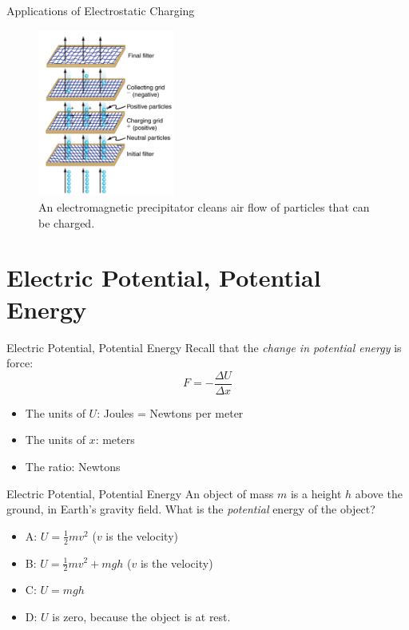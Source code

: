 \documentclass{beamer}
\begin{document}
\begin{frame}{Applications of Electrostatic Charging}
\begin{figure}
\centering
\includegraphics[width=0.4\textwidth]{figures/app4.png}
\caption{\label{fig:app4} An electromagnetic precipitator cleans air flow of particles that can be charged.}
\end{figure}
\end{frame}

\section{Electric Potential, Potential Energy}

\begin{frame}{Electric Potential, Potential Energy}
Recall that the \textit{change in potential energy} is force:
\begin{equation}
F = -\frac{\Delta U}{\Delta x}
\end{equation}
\begin{itemize}
\item The units of $U$: Joules = Newtons per meter
\item The units of $x$: meters
\item The ratio: Newtons
\end{itemize}
\end{frame}

\begin{frame}{Electric Potential, Potential Energy}
An object of mass $m$ is a height $h$ above the ground, in Earth's gravity field.  What is the \textit{potential} energy of the object?
\begin{itemize}
\item A: $U = \frac{1}{2}mv^2$ ($v$ is the velocity)
\item B: $U = \frac{1}{2}mv^2 + mgh$ ($v$ is the velocity)
\item C: $U = mgh$
\item D: $U$ is zero, because the object is at rest.
\end{itemize}
\end{frame}
\end{document}
